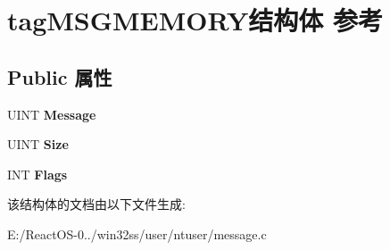 \hypertarget{structtag_m_s_g_m_e_m_o_r_y}{}\section{tag\+M\+S\+G\+M\+E\+M\+O\+R\+Y结构体 参考}
\label{structtag_m_s_g_m_e_m_o_r_y}
\subsection*{Public 属性}
\begin{DoxyCompactItemize}
\item 
\mbox{\label{structtag_m_s_g_m_e_m_o_r_y_a95190742333d09aa9304f9f577205399}} 
U\+I\+NT {\bfseries Message}
\item 
\mbox{\label{structtag_m_s_g_m_e_m_o_r_y_a4c67bc7adf78c3ea18462cfe9f6c67d0}} 
U\+I\+NT {\bfseries Size}
\item 
\mbox{\label{structtag_m_s_g_m_e_m_o_r_y_ab0479ceb311b4e85e88f0e271171495b}} 
I\+NT {\bfseries Flags}
\end{DoxyCompactItemize}


该结构体的文档由以下文件生成\+:\begin{DoxyCompactItemize}
\item 
E\+:/\+React\+O\+S-\/0../win32ss/user/ntuser/message.\+c\end{DoxyCompactItemize}
